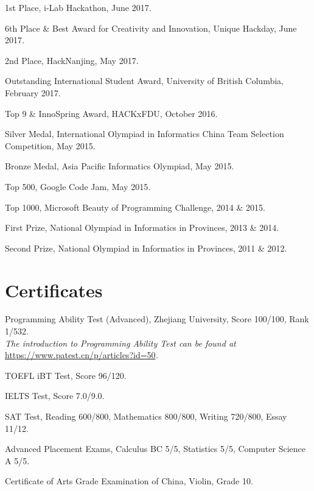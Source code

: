\documentclass[letterpaper]{article}
\renewenvironment{itemize}{
  \begin{list}{}{
    \setlength{\leftmargin}{1.5em}
  }
}{
  \end{list}
}
\begin{document}
\begin{itemize}
  \item 1st Place, i-Lab Hackathon, June 2017.

  \item 6th Place \& Best Award for Creativity and Innovation, Unique Hackday, June 2017.

  \item 2nd Place, HackNanjing, May 2017.

  \item Outstanding International Student Award, University of British Columbia, February 2017.

  \item Top 9 \& InnoSpring Award, HACKxFDU, October 2016.

  \item Silver Medal, International Olympiad in Informatics China Team Selection Competition, May 2015.

  \item Bronze Medal, Asia Pacific Informatics Olympiad, May 2015.

  \item Top 500, Google Code Jam, May 2015.

  \item Top 1000, Microsoft Beauty of Programming Challenge, 2014 \& 2015.

  \item First Prize, National Olympiad in Informatics in Provinces, 2013 \& 2014.

  \item Second Prize, National Olympiad in Informatics in Provinces, 2011 \& 2012.
\end{itemize}


\section*{Certificates}

\begin{itemize}
  \item Programming Ability Test (Advanced), Zhejiang University, Score 100/100, Rank 1/532.\\
  \emph{The introduction to Programming Ability Test can be found at }\url{https://www.patest.cn/p/articles?id=50}\emph{.}

  \item TOEFL iBT Test, Score 96/120.

  \item IELTS Test, Score 7.0/9.0.

  \item SAT Test, Reading 600/800, Mathematics 800/800, Writing 720/800, Essay 11/12.

  \item Advanced Placement Exams, Calculus BC 5/5, Statistics 5/5, Computer Science A 5/5.

  \item Certificate of Arts Grade Examination of China, Violin, Grade 10.
\end{itemize}
\end{document}
